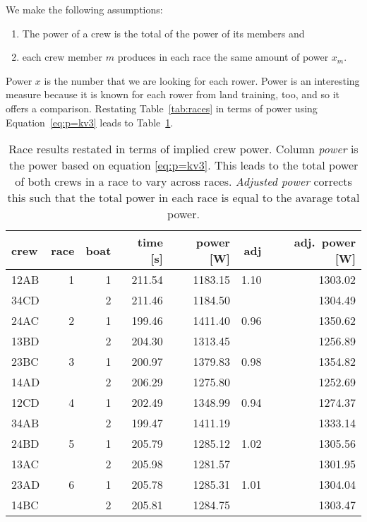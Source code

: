 \documentclass[a4paper,11pt]{article}
\begin{document}
We make the following assumptions:

\begin{enumerate}
\item The power of a crew is the total of the power of its
      members and 
\item each crew member $m$ produces in each
      race the same amount of power $x_m$.
\end{enumerate}

Power $x$ is the number that we are looking for each rower. Power is an
interesting measure because it is known for each rower from land
training, too, and so it offers a comparison.  Restating
Table~\ref{tab:races} in terms of power using Equation~\ref{eq:p=kv3}
leads to Table~\ref{tab:races_power}.

\begin{table}[ht]
\centering
\begin{tabular}{lrrrrrr}
  \toprule
 crew & race & boat & time [s] & power [W] & adj &  adj.~power [W]\\ 
  \midrule
  12AB &   1 & 1& 211.54 & 1183.15 & 1.10 & 1303.02 \\ 
  34CD &     & 2& 211.46 & 1184.50 &      & 1304.49 \\ [.8ex]
  24AC &   2 & 1& 199.46 & 1411.40 & 0.96 & 1350.62 \\ 
  13BD &     & 2& 204.30 & 1313.45 &      & 1256.89 \\ [.8ex]
  23BC &   3 & 1& 200.97 & 1379.83 & 0.98 & 1354.82 \\ 
  14AD &     & 2& 206.29 & 1275.80 &      & 1252.69 \\ [.8ex]
  12CD &   4 & 1& 202.49 & 1348.99 & 0.94 & 1274.37 \\ 
  34AB &     & 2& 199.47 & 1411.19 &      & 1333.14 \\ [.8ex]
  24BD &   5 & 1& 205.79 & 1285.12 & 1.02 & 1305.56 \\ 
  13AC &     & 2& 205.98 & 1281.57 &      & 1301.95 \\ [.8ex]
  23AD &   6 & 1& 205.78 & 1285.31 & 1.01 & 1304.04 \\ 
  14BC &     & 2& 205.81 & 1284.75 &      & 1303.47 \\ 
   \bottomrule
\end{tabular}
\caption{\label{tab:races_power} Race results restated in terms of
implied crew power. Column \emph{power} is the power based on equation
\ref{eq:p=kv3}. This leads to the total power of both crews in a race to
vary across races. \emph{Adjusted power} corrects this such that the
total power in each race is equal to the avarage total power.}
\end{table}
\end{document}
